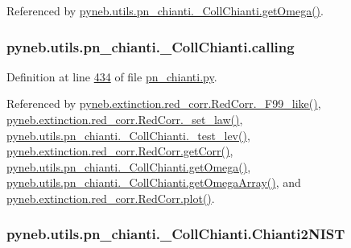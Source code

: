 Referenced by \hyperlink{pn__chianti_8py_source_l00507}{pyneb.\-utils.\-pn\-\_\-chianti.\-\_\-\-Coll\-Chianti.\-get\-Omega()}.

\hypertarget{classpyneb_1_1utils_1_1pn__chianti_1_1___coll_chianti_ab58a9cfcb76b7c72b9b815c5700e7aae}{
\subsubsection[{calling}]{\setlength{\rightskip}{0pt plus 5cm}pyneb.\-utils.\-pn\-\_\-chianti.\-\_\-\-Coll\-Chianti.\-calling}}\label{classpyneb_1_1utils_1_1pn__chianti_1_1___coll_chianti_ab58a9cfcb76b7c72b9b815c5700e7aae}


Definition at line \hyperlink{pn__chianti_8py_source_l00434}{434} of file \hyperlink{pn__chianti_8py_source}{pn\-\_\-chianti.\-py}.



Referenced by \hyperlink{red__corr_8py_source_l00658}{pyneb.\-extinction.\-red\-\_\-corr.\-Red\-Corr.\-\_\-\-F99\-\_\-like()}, \hyperlink{red__corr_8py_source_l00176}{pyneb.\-extinction.\-red\-\_\-corr.\-Red\-Corr.\-\_\-set\-\_\-law()}, \hyperlink{pn__chianti_8py_source_l00472}{pyneb.\-utils.\-pn\-\_\-chianti.\-\_\-\-Coll\-Chianti.\-\_\-test\-\_\-lev()}, \hyperlink{red__corr_8py_source_l00211}{pyneb.\-extinction.\-red\-\_\-corr.\-Red\-Corr.\-get\-Corr()}, \hyperlink{pn__chianti_8py_source_l00507}{pyneb.\-utils.\-pn\-\_\-chianti.\-\_\-\-Coll\-Chianti.\-get\-Omega()}, \hyperlink{pn__chianti_8py_source_l00484}{pyneb.\-utils.\-pn\-\_\-chianti.\-\_\-\-Coll\-Chianti.\-get\-Omega\-Array()}, and \hyperlink{red__corr_8py_source_l00303}{pyneb.\-extinction.\-red\-\_\-corr.\-Red\-Corr.\-plot()}.

\hypertarget{classpyneb_1_1utils_1_1pn__chianti_1_1___coll_chianti_a1d2846276b84d8ec47c08b7d32eb7756}{
\subsubsection[{Chianti2\-N\-I\-S\-T}]{\setlength{\rightskip}{0pt plus 5cm}pyneb.\-utils.\-pn\-\_\-chianti.\-\_\-\-Coll\-Chianti.\-Chianti2\-N\-I\-S\-T}}\label{classpyneb_1_1utils_1_1pn__chianti_1_1___coll_chianti_a1d2846276b84d8ec47c08b7d32eb7756}


